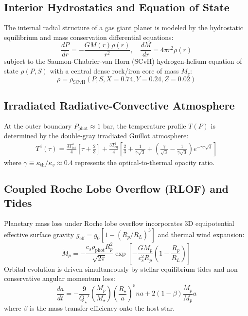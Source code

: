 \documentclass[twocolumn,10pt,a4paper]{article}
\begin{document}
\subsection{Interior Hydrostatics and Equation of State}
The internal radial structure of a gas giant planet is modeled by the hydrostatic equilibrium and mass conservation differential equations:
\begin{equation}
\frac{dP}{dr} = -\frac{G M(r) \rho(r)}{r^2}, \quad \frac{dM}{dr} = 4\pi r^2 \rho(r)
\end{equation}
subject to the Saumon-Chabrier-van Horn (SCvH) hydrogen-helium equation of state $\rho(P, S)$ with a central dense rock/iron core of mass $M_c$:
\begin{equation}
\rho = \rho_{\text{SCvH}}(P, S, X=0.74, Y=0.24, Z=0.02)
\end{equation}

\subsection{Irradiated Radiative-Convective Atmosphere}
At the outer boundary $P_{\text{phot}} \approx 1\text{ bar}$, the temperature profile $T(P)$ is determined by the double-gray irradiated Guillot atmosphere:
\begin{align}
T^4(\tau) = \frac{3 T_{\text{int}}^4}{4} \left[ \tau + \frac{2}{3} \right] + \frac{3 T_{\text{eq}}^4}{4} \left[ \frac{2}{3} + \frac{1}{\gamma\sqrt{3}} + \left(\frac{\gamma}{\sqrt{3}} - \frac{1}{\gamma\sqrt{3}}\right) e^{-\gamma\tau\sqrt{3}} \right]
\end{align}
where $\gamma \equiv \kappa_{\text{th}} / \kappa_v \approx 0.4$ represents the optical-to-thermal opacity ratio.

\subsection{Coupled Roche Lobe Overflow (RLOF) and Tides}
Planetary mass loss under Roche lobe overflow incorporates 3D equipotential effective surface gravity $g_{\text{eff}} = g_0 [1 - (R_p / R_L)^3]$ and thermal wind expansion:
\begin{equation}
\dot{M}_p = -\frac{c_s \rho_{\text{phot}} R_p^2}{\sqrt{2\pi}} \exp\left[ -\frac{G M_p}{c_s^2 R_p} \left(1 - \frac{R_p}{R_L}\right) \right]
\end{equation}
Orbital evolution is driven simultaneously by stellar equilibrium tides and non-conservative angular momentum loss:
\begin{equation}
\frac{da}{dt} = -\frac{9}{Q_\star'} \left(\frac{M_p}{M_\star}\right) \left(\frac{R_\star}{a}\right)^5 n a + 2 (1 - \beta) \frac{\dot{M}_p}{M_p} a
\end{equation}
where $\beta$ is the mass transfer efficiency onto the host star.
\end{document}
